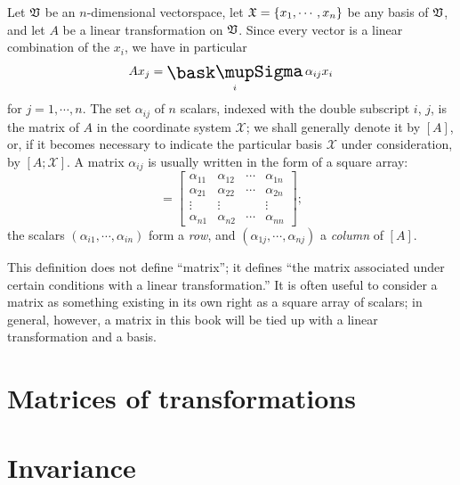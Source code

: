 \begin{definition}
    Let \(\frak{V}\) be an \(n\)-dimensional vectorspace, let \(\frak{X} =
    \{x_1, \cdots , x_n\}\)  be any basis of \(\frak{V}\), and let \(A\) be a
    linear transformation on \(\frak{V}\). Since every vector is a linear
    combination of the \(x_i\), we have in particular
    \begin{equation*}
        Ax_j = \sumx_i \alpha_{ij} x_i
    \end{equation*}
    for \(j = 1,\cdots, n\). The set \(\alpha_{ij}\) of \(n\) scalars, indexed with the double subscript \(i\), \(j\), is the matrix of \(A\) in the coordinate system \(\mathcal{X}\); we shall generally denote it by \([A]\), or, if it becomes necessary to indicate the particular basis \(\mathcal{X}\) under consideration, by \([A; \mathcal{X}]\). A matrix
    \(\alpha_{ij}\) is usually written in the form of a square array:
    \begin{equation*}
        [A] = \begin{bmatrix}
            \alpha_{11} & \alpha_{12} & \cdots & \alpha_{1n} \\
            \alpha_{21} & \alpha_{22} & \cdots & \alpha_{2n} \\
            \vdots & \vdots &  & \vdots \\
            \alpha_{n1} & \alpha_{n2} & \cdots & \alpha_{nn}
        \end{bmatrix};
    \end{equation*}
    the scalars \((\alpha_{i1}, \cdots, \alpha_{in})\) form a \emph{row}, and \( (\alpha_{1j}, \cdots, \alpha_{nj})\) a \emph{column} of \([A]\).
\end{definition}

This definition does not define ``matrix''; it defines ``the matrix associated
under certain conditions with a linear transformation.'' It is often useful to
consider a matrix as something existing in its own right as a square array of
scalars; in general, however, a matrix in this book will be tied up with a
linear transformation and a basis.

\section{Matrices of transformations}

\section{Invariance}

